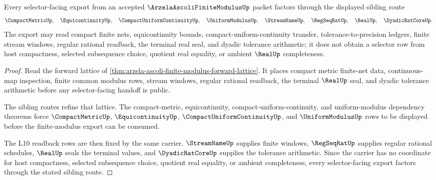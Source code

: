 \begin{theorem}
\label{thm:arzela-ascoli-finite-modulus-sibling-route}
Every selector-facing export from an accepted $\ArzelaAscoliFiniteModulusUp$ packet factors through the displayed sibling route
$$
\CompactMetricUp,\quad \EquicontinuityUp,\quad \CompactUniformContinuityUp,\quad \UniformModulusUp,\quad \StreamNameUp,\quad \RegSeqRatUp,\quad \RealUp,\quad \DyadicRatCoreUp.
$$
The export may read compact finite nets, equicontinuity bounds, compact-uniform-continuity transfer, tolerance-to-precision ledgers, finite stream windows, regular rational readback, the terminal real seal, and dyadic tolerance arithmetic; it does not obtain a selector row from host compactness, selected subsequence choice, quotient real equality, or ambient $\RealUp$ completeness.
\end{theorem}
\begin{proof}
Read the forward lattice of \autoref{thm:arzela-ascoli-finite-modulus-forward-lattice}. It places compact metric finite-net data, continuous-map inspection, finite common modulus rows, stream windows, regular rational readback, the terminal $\RealUp$ seal, and dyadic tolerance arithmetic before any selector-facing handoff is public.

The sibling routes refine that lattice. The compact-metric, equicontinuity, compact-uniform-continuity, and uniform-modulus dependency theorems force $\CompactMetricUp$, $\EquicontinuityUp$, $\CompactUniformContinuityUp$, and $\UniformModulusUp$ rows to be displayed before the finite-modulus export can be consumed.

The L10 readback rows are then fixed by the same carrier. $\StreamNameUp$ supplies finite windows, $\RegSeqRatUp$ supplies regular rational schedules, $\RealUp$ seals the terminal values, and $\DyadicRatCoreUp$ supplies the tolerance arithmetic. Since the carrier has no coordinate for host compactness, selected subsequence choice, quotient real equality, or ambient completeness, every selector-facing export factors through the stated sibling route.
\end{proof}
